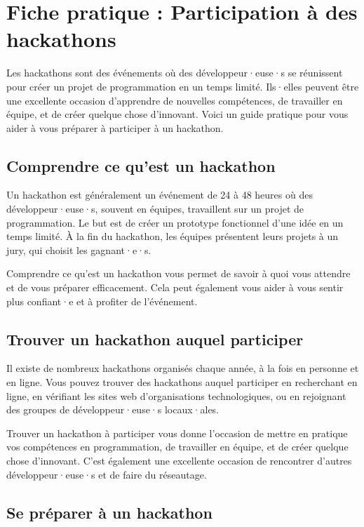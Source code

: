 \chapter{Fiche pratique : Participation à des hackathons}

Les hackathons sont des événements où des développeur·euse·s se réunissent pour créer un projet de programmation en un temps limité. Ils·elles peuvent être une excellente occasion d'apprendre de nouvelles compétences, de travailler en équipe, et de créer quelque chose d'innovant. Voici un guide pratique pour vous aider à vous préparer à participer à un hackathon.

\section{Comprendre ce qu'est un hackathon}

Un hackathon est généralement un événement de 24 à 48 heures où des développeur·euse·s, souvent en équipes, travaillent sur un projet de programmation. Le but est de créer un prototype fonctionnel d'une idée en un temps limité. À la fin du hackathon, les équipes présentent leurs projets à un jury, qui choisit les gagnant·e·s.

Comprendre ce qu'est un hackathon vous permet de savoir à quoi vous attendre et de vous préparer efficacement. Cela peut également vous aider à vous sentir plus confiant·e et à profiter de l'événement.

\section{Trouver un hackathon auquel participer}

Il existe de nombreux hackathons organisés chaque année, à la fois en personne et en ligne. Vous pouvez trouver des hackathons auquel participer en recherchant en ligne, en vérifiant les sites web d'organisations technologiques, ou en rejoignant des groupes de développeur·euse·s locaux·ales.

Trouver un hackathon à participer vous donne l'occasion de mettre en pratique vos compétences en programmation, de travailler en équipe, et de créer quelque chose d'innovant. C'est également une excellente occasion de rencontrer d'autres développeur·euse·s et de faire du réseautage.

\section{Se préparer à un hackathon}

